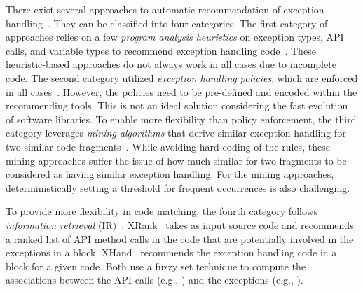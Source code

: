 There exist several approaches to automatic recommendation of
exception
handling~\cite{barbosa-bsse12,chanchal-scam14,barbosa-tse18,barbosa-tse16,xrank-fse20,throw-ase22}. They
can be classified into four categories. The first category of
approaches relies on a few {\em program analysis heuristics} on
exception types, API calls, and variable types to recommend exception
handling code~\cite{barbosa-bsse12}. These heuristic-based approaches
do not always work in all cases due to incomplete code. The second
category utilized {\em exception handling policies},
which are enforced in all
cases~\cite{barbosa-tse16,barbosa-saner18}. However, the policies need
to be pre-defined and encoded within the recommending tools.  This is
not an ideal solution considering the fast evolution of software
libraries. To enable more flexibility than policy enforcement, the
third category leverages {\em mining algorithms} that derive similar
exception handling for two similar code
fragments~\cite{chanchal-scam14}. While avoiding hard-coding of the
rules, these mining approaches suffer the issue of how much similar
for two fragments to be considered as having similar exception
handling. For the mining approaches, deterministically setting a
threshold for frequent occurrences is also challenging.

To provide more flexibility in code matching, the fourth category
follows {\em information retrieval}
(IR)~\cite{xrank-fse20}. XRank~\cite{xrank-fse20} takes as input
source code and recommends a ranked list of API method calls in the
code that are potentially involved in the exceptions in a 
block. XHand~\cite{xrank-fse20} recommends the exception handling
code in a  block for a given code. Both use a fuzzy set
technique to compute the associations between the API calls (e.g.,
) and the exceptions (e.g.,
).


